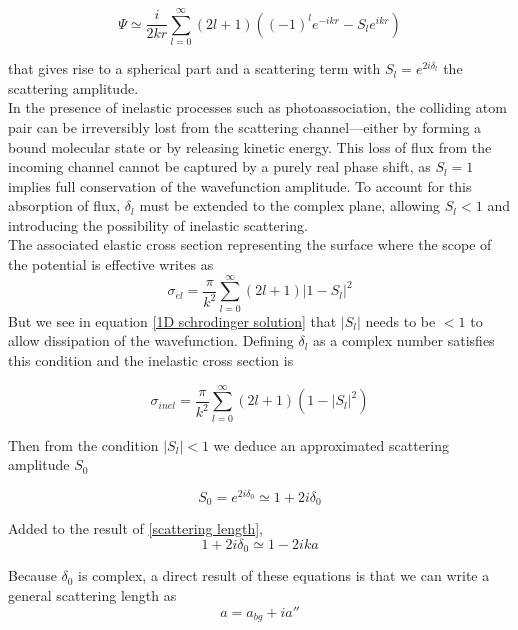 \begin{equation}
    \Psi \simeq \frac{i}{2kr}\sum_{l=0}^{\infty}(2l+1)\left((-1)^l e^{-ikr} - S_l e^{ikr}\right)
    \label{1D schrodinger solution}
\end{equation}

that gives rise to a spherical part and a scattering term with $S_l = e^{2i\delta_l}$ the scattering amplitude.\\

In the presence of inelastic processes such as photoassociation, the colliding atom pair can be irreversibly lost 
from the scattering channel---either by forming a bound molecular 
state or by releasing kinetic energy. This loss of flux from the
incoming channel cannot be captured by a purely real phase shift, 
as $S_l = 1$ implies full conservation of the wavefunction 
amplitude. To account for this absorption of flux, $\delta_l$ 
must be extended to the complex plane, allowing $S_l < 1$
and introducing the possibility of inelastic scattering.\\

The associated elastic cross section representing the surface where the scope 
of the potential is effective writes as
\begin{equation}
    \sigma_{el} = \frac{\pi}{k^2}\sum_{l=0}^{\infty}(2l+1)|1-S_l|^2
    \label{sigma elastic}
\end{equation}
But we see in equation \ref{1D schrodinger solution} that $|S_l|$ needs to be $<1$ to allow dissipation of the
wavefunction. Defining $\delta_l$ as a complex number satisfies this condition and the inelastic cross section
is

\begin{equation}
    \sigma_{inel} = \frac{\pi}{k^2}\sum_{l=0}^{\infty}(2l+1)(1-|S_l|^2)
    \label{sigma inelastic}
\end{equation}


Then from the condition $|S_l| < 1$ we deduce an approximated scattering amplitude $S_0$

\begin{equation}
    S_0 = e^{2i\delta_0} \simeq 1 + 2i\delta_0
\end{equation}

Added to the result of \ref{scattering length},
\begin{equation}
     1 + 2i\delta_0 \simeq 1 - 2ika
\end{equation}

Because $\delta_0$ is complex, a direct result of these equations is that we can write a general scattering length as
\begin{equation}
    a = a_{bg} + i a''
\end{equation}

